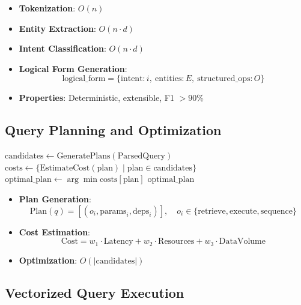 \documentclass[11pt]{article}
\begin{document}
\begin{itemize}
    \item \textbf{Tokenization}: \( O(n) \)
    \item \textbf{Entity Extraction}: \( O(n \cdot d) \)
    \item \textbf{Intent Classification}: \( O(n \cdot d) \)
    \item \textbf{Logical Form Generation}:
    \[
    \text{logical\_form} = \{ \text{intent}: i,\ \text{entities}: E,\ \text{structured\_ops}: O \}
    \]
    \item \textbf{Properties}: Deterministic, extensible, F1 \( > 90\% \)
\end{itemize}

\subsection{Query Planning and Optimization}
\label{subsec:query_planning}

\begin{algorithm}
\caption{Query Planning}
\label{alg:query_planning}
\begin{algorithmic}[1]
    \State \( \text{candidates} \gets \text{GeneratePlans}(\text{ParsedQuery}) \)
    \State \( \text{costs} \gets \{ \text{EstimateCost}(\text{plan}) \mid \text{plan} \in \text{candidates} \} \)
    \State \( \text{optimal\_plan} \gets \arg\min \text{costs}[\text{plan}] \)
    \State \Return \( \text{optimal\_plan} \)
\EndFunction
\end{algorithmic}
\end{algorithm}

\begin{itemize}
    \item \textbf{Plan Generation}:
    \[
    \text{Plan}(q) = [(o_i, \text{params}_i, \text{deps}_i)],\quad o_i \in \{ \text{retrieve}, \text{execute}, \text{sequence} \}
    \]
    \item \textbf{Cost Estimation}:
    \[
    \text{Cost} = w_1 \cdot \text{Latency} + w_2 \cdot \text{Resources} + w_3 \cdot \text{DataVolume}
    \]
    \item \textbf{Optimization}: \( O(|\text{candidates}|) \)
\end{itemize}

\subsection{Vectorized Query Execution}
\label{subsec:vectorized_execution}
\end{document}
